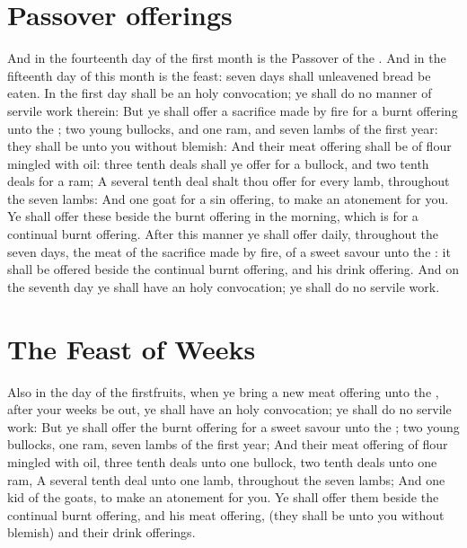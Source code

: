 \begin{biblechapter}
\section*{Passover offerings}
\verse And in the fourteenth day of the first month is the Passover of the \LORD.
\verse And in the fifteenth day of this month is the feast: seven days shall unleavened bread be eaten.
\verse In the first day shall be an holy convocation; ye shall do no manner of servile work therein:
\verse But ye shall offer a sacrifice made by fire for a burnt offering unto the \LORD; two young bullocks, and one ram, and seven lambs of the first year: they shall be unto you without blemish:
\verse And their meat offering shall be of flour mingled with oil: three tenth deals shall ye offer for a bullock, and two tenth deals for a ram;
\verse A several tenth deal shalt thou offer for every lamb, throughout the seven lambs:
\verse And one goat for a sin offering, to make an atonement for you.
\verse Ye shall offer these beside the burnt offering in the morning, which is for a continual burnt offering.
\verse After this manner ye shall offer daily, throughout the seven days, the meat of the sacrifice made by fire, of a sweet savour unto the \LORD: it shall be offered beside the continual burnt offering, and his drink offering.
\verse And on the seventh day ye shall have an holy convocation; ye shall do no servile work.
\section*{The Feast of Weeks}
\verse Also in the day of the firstfruits, when ye bring a new meat offering unto the \LORD, after your weeks be out, ye shall have an holy convocation; ye shall do no servile work:
\verse But ye shall offer the burnt offering for a sweet savour unto the \LORD; two young bullocks, one ram, seven lambs of the first year;
\verse And their meat offering of flour mingled with oil, three tenth deals unto one bullock, two tenth deals unto one ram,
\verse A several tenth deal unto one lamb, throughout the seven lambs;
\verse And one kid of the goats, to make an atonement for you.
\verse Ye shall offer them beside the continual burnt offering, and his meat offering, (they shall be unto you without blemish) and their drink offerings.
\end{biblechapter}

